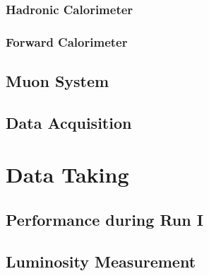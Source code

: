 \subsubsection{Hadronic Calorimeter}\label{sec:ATLAS-calorimeters-hcal}


\subsubsection{Forward Calorimeter}\label{sec:ATLAS-calorimeters-fcal}



\subsection{Muon System}

\subsection{Data Acquisition}




\section{Data Taking}
\subsection{Performance during Run I}

\subsection{Luminosity Measurement}


\printbibliography